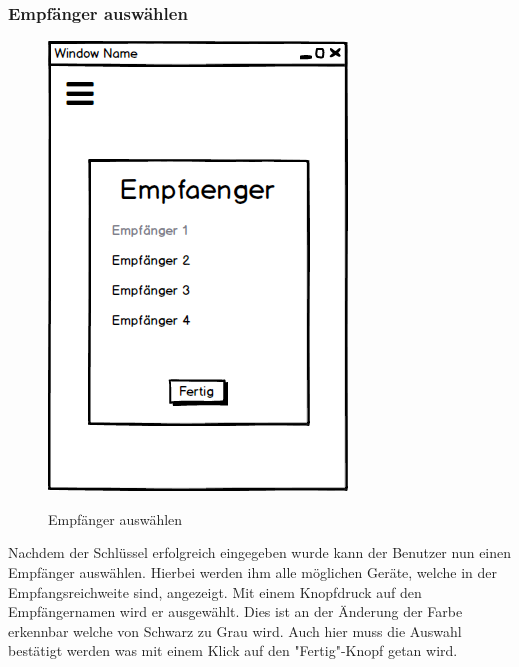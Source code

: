 \subsubsection{Empfänger auswählen}
\begin{figure}[H]
	\centering
	\includegraphics[width=.7\linewidth]{pictures/Desktop/Empfaenger.png}\
	\caption{Empfänger auswählen}
\end{figure}
Nachdem der Schlüssel erfolgreich eingegeben wurde kann der Benutzer nun einen Empfänger auswählen. Hierbei werden ihm alle möglichen Geräte, welche in der Empfangsreichweite sind, angezeigt. Mit einem Knopfdruck auf den Empfängernamen wird er ausgewählt. Dies ist an der Änderung der Farbe erkennbar welche von Schwarz zu Grau wird. Auch hier muss die Auswahl bestätigt werden was mit einem Klick auf den "Fertig"-Knopf getan wird.

